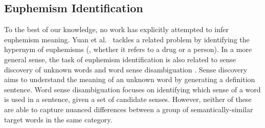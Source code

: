 




\subsection{Euphemism Identification}
\label{sec:related_iden}
To the best of our knowledge, no work has explicitly attempted to infer euphemism meaning.
Yuan et al.\ \cite{yuan2018reading} tackles a related problem by identifying the hypernym of euphemisms (\eg, whether it refers to a drug or a person).
In a more general sense, the task of euphemism identification is also related to sense discovery of unknown words \cite{ishiwatari2019learning,ni2017learning} and word sense disambiguation \cite{taghipour2015semi,raganato2017neural,raganato2017word,iacobacci2016embeddings}. 
Sense discovery aims to understand the meaning of an unknown word by generating a definition sentence. 
Word sense disambiguation focuses on identifying which sense of a word is used in a sentence, given a set of candidate senses.
However, neither of these are able to capture nuanced differences between a group of semantically-similar target words in the same category. 

